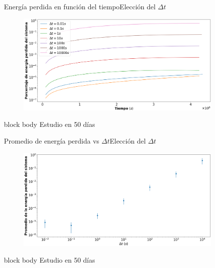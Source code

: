 \documentclass{beamer}
\begin{document}
            \begin{frame}{Energía perdida en función del tiempo}{Elección del $\Delta t$}
                    \begin{figure}[H!]
                        \includegraphics[width=0.9\textwidth]{./energia_perdida_vs_tiempo}
                        \label{fig:marte_3}
                    \end{figure}
                    \begin{beamercolorbox}[sep=5pt,center]{block body}
                        \centering
                        \small{Estudio en 50 días}
                    \end{beamercolorbox}
            \end{frame}

            \begin{frame}{Promedio de energía perdida vs $\Delta t$}{Elección del $\Delta t$}
                \begin{figure}[H!]
                    \includegraphics[width=0.9\textwidth]{./promedio_energia_perdida_vs_dt}
                    \label{fig:marte_4}
                \end{figure}
                \begin{beamercolorbox}[sep=5pt,center]{block body}
                    \centering
                    \small{Estudio en 50 días}
                \end{beamercolorbox}
            \end{frame}
\end{document}
